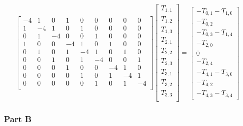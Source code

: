 \documentclass[12pt, a4paper]{article}
\begin{document}
\begin{equation}
\begin{bmatrix}
-4 & 1 & 0 & 1 & 0 & 0 & 0 & 0 & 0 \\
1 & -4 & 1 & 0 & 1 & 0 & 0 & 0 & 0 \\
0 & 1 & -4 & 0 & 0 & 1 & 0 & 0 & 0 \\
1 & 0 & 0 & -4 & 1 & 0 & 1 & 0 & 0 \\
0 & 1 & 0 & 1 & -4 & 1 & 0 & 1 & 0 \\
0 & 0 & 1 & 0 & 1 & -4 & 0 & 0 & 1 \\
0 & 0 & 0 & 1 & 0 & 0 & -4 & 1 & 0 \\
0 & 0 & 0 & 0 & 1 & 0 & 1 & -4 & 1 \\
0 & 0 & 0 & 0 & 0 & 1 & 0 & 1 & -4 \\
\end{bmatrix} 
\begin{bmatrix}
T_{1,1}\\
T_{1,2}\\
T_{1,3}\\
T_{2,1}\\
T_{2,2}\\
T_{2,3}\\
T_{3,1}\\
T_{3,2}\\
T_{3,3}\\
\end{bmatrix}=
\begin{bmatrix}
- T_{0,1} - T_{1,0}\\
- T_{0,2}\\
- T_{0,3} - T_{1,4}\\
- T_{2,0}\\  
0\\
- T_{2,4}\\ 
- T_{4,1} - T_{3,0}\\
- T_{4,2}\\
- T_{4,3} - T_{3,4}
\end{bmatrix}
\end{equation}


\subsubsection{Part B}
\end{document}
